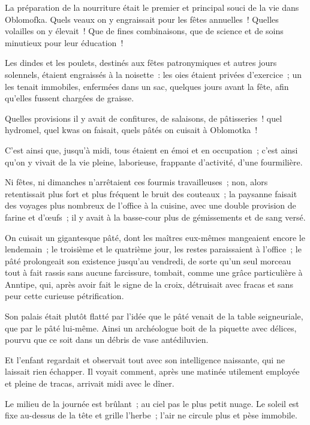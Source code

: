\documentclass[french,twoside]{book} %
\begin{document}
La préparation de la nourriture était le premier et principal souci de la vie dans Oblomofka. Quels veaux on y engraissait pour les fêtes annuelles ! Quelles volailles on y élevait ! Que de fines combinaisons, que de science et de soins minutieux pour leur éducation !\par
Les dindes et les poulets, destinés aux fêtes patronymiques et autres jours solennels, étaient engraissés à la noisette : les oies étaient privées d’exercice ; un les tenait immobiles, enfermées dans un sac, quelques jours avant la fête, afin qu’elles fussent chargées de graisse.\par
Quelles provisions il y avait de confitures, de salaisons, de pâtisseries ! quel hydromel, quel kwas on faisait, quels pâtés on cuisait à Oblomotka !\par
C’est ainsi que, jusqu’à midi, tous étaient en émoi et en occupation ; c’est ainsi qu’on y vivait de la vie pleine, laborieuse, frappante d’activité, d’une fourmilière.\par
Ni fêtes, ni dimanches n’arrêtaient ces fourmis travailleuses ; non, alors retentissait plus fort et plus fréquent le bruit des couteaux ; la paysanne faisait des voyages plus nombreux de l’office à la cuisine, avec une double provision de farine et d’œufs ; il y avait à la basse-cour plus de gémissements et de sang versé.\par
On cuisait un gigantesque pâté, dont les maîtres eux-mêmes mangeaient encore le lendemain ; le troisième et le quatrième jour, les restes paraissaient à l’office ; le pâté prolongeait son existence jusqu’au vendredi, de sorte qu’un seul morceau tout à fait rassis sans aucune farcissure, tombait, comme une grâce particulière à Anntipe, qui, après avoir fait le signe de la croix, détruisait avec fracas et sans peur cette curieuse pétrification.\par
Son palais était plutôt flatté par l’idée que le pâté venait de la table seigneuriale, que par le pâté lui-même. Ainsi un archéologue boit de la piquette avec délices, pourvu que ce soit dans un débris de vase antédiluvien.\par
Et l’enfant regardait et observait tout avec son intelligence naissante, qui ne laissait rien échapper. Il voyait comment, après une matinée utilement employée et pleine de tracas, arrivait midi avec le dîner.\par
Le milieu de la journée est brûlant ; au ciel pas le plus petit nuage. Le soleil est fixe au-dessus de la tête et grille l’herbe ; l’air ne circule plus et pèse immobile.\par
\end{document}
